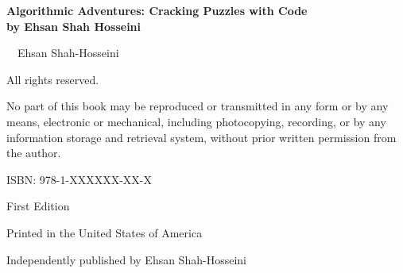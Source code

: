 \newpage
\thispagestyle{empty}
\vspace*{\fill}
\begin{center}
    \textbf{\Huge Algorithmic Adventures: Cracking Puzzles with Code} \\[1em]
    \textbf{\Large by Ehsan Shah Hosseini}
    \vspace{2em}

    \textcopyright\
    \the\year\ Ehsan Shah-Hosseini

    All rights reserved.

    No part of this book may be reproduced or transmitted in any form or by any means, electronic or mechanical, including photocopying, recording, or by any information storage and retrieval system, without prior written permission from the author.

    \vspace{2em}

    ISBN: 978-1-XXXXXX-XX-X  %

    \vspace{2em}

    First Edition

    \vspace{2em}

    Printed in the United States of America

    \vspace{2em}

    Independently published by Ehsan Shah-Hosseini

\end{center}
\vspace*{\fill}
\newpage